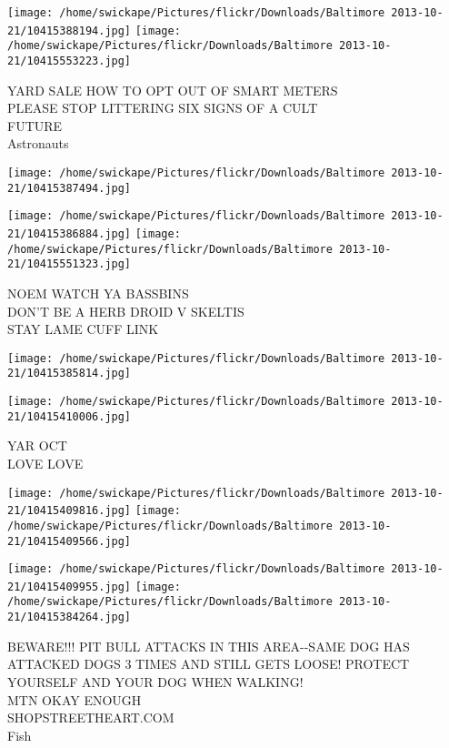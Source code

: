 \documentclass[10pt,letterpaper]{article}
\begin{document}
\texttt{[image: /home/swickape/Pictures/flickr/Downloads/Baltimore 2013-10-21/10415388194.jpg]}
\texttt{[image: /home/swickape/Pictures/flickr/Downloads/Baltimore 2013-10-21/10415553223.jpg]}

YARD SALE HOW TO OPT OUT OF SMART METERS\\
PLEASE STOP LITTERING SIX SIGNS OF A CULT\\
FUTURE\\
Astronauts\\
\pagebreak

\texttt{[image: /home/swickape/Pictures/flickr/Downloads/Baltimore 2013-10-21/10415387494.jpg]}

\vspace{0.25in}
\texttt{[image: /home/swickape/Pictures/flickr/Downloads/Baltimore 2013-10-21/10415386884.jpg]}
\texttt{[image: /home/swickape/Pictures/flickr/Downloads/Baltimore 2013-10-21/10415551323.jpg]}

NOEM WATCH YA BASSBINS\\
DON'T BE A HERB DROID V SKELTIS\\
STAY LAME CUFF LINK\\
\pagebreak

\texttt{[image: /home/swickape/Pictures/flickr/Downloads/Baltimore 2013-10-21/10415385814.jpg]}

\vspace{0.25in}
\texttt{[image: /home/swickape/Pictures/flickr/Downloads/Baltimore 2013-10-21/10415410006.jpg]}

YAR OCT\\
LOVE LOVE\\
\pagebreak

\texttt{[image: /home/swickape/Pictures/flickr/Downloads/Baltimore 2013-10-21/10415409816.jpg]}
\texttt{[image: /home/swickape/Pictures/flickr/Downloads/Baltimore 2013-10-21/10415409566.jpg]}

\texttt{[image: /home/swickape/Pictures/flickr/Downloads/Baltimore 2013-10-21/10415409955.jpg]}
\texttt{[image: /home/swickape/Pictures/flickr/Downloads/Baltimore 2013-10-21/10415384264.jpg]}

BEWARE!!! PIT BULL ATTACKS IN THIS AREA{-}{-}SAME DOG HAS ATTACKED DOGS 3 TIMES AND STILL GETS LOOSE! PROTECT YOURSELF AND YOUR DOG WHEN WALKING!\\
MTN OKAY ENOUGH\\
SHOPSTREETHEART.COM\\
Fish\\
\pagebreak
\end{document}
